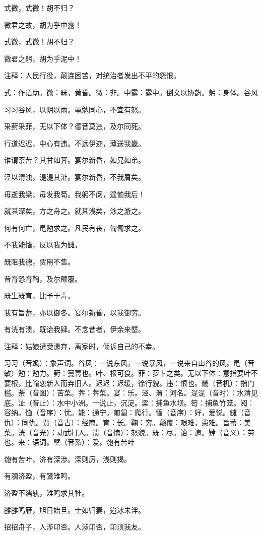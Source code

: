 \documentclass[12pt,UTF8]{ctexbook}
\begin{document}
式微，式微！胡不归？

微君之故，胡为乎中露！

式微，式微！胡不归？

微君之躬，胡为乎泥中！

注释：人民行役，颠连困苦，对统治者发出不平的怨恨。 

式：作语助。微：昧，黄昏。微：非。中露：露中。倒文以协韵。躬：身体。谷风

习习谷风，以阴以雨。黾勉同心，不宜有怒。

采葑采菲，无以下体？德音莫违，及尔同死。

行道迟迟，中心有违。不远伊迩，薄送我畿。

谁谓荼苦？其甘如荠。宴尔新昏，如兄如弟。

泾以渭浊，湜湜其沚。宴尔新昏，不我屑矣。

毋逝我梁，毋发我笱。我躬不阅，遑恤我后！

就其深矣，方之舟之。就其浅矣，泳之游之。

何有何亡，黾勉求之。凡民有丧，匍匐求之。

不我能慉，反以我为雠，

既阻我德，贾用不售。

昔育恐育鞫，及尔颠覆。

既生既育，比予于毒。

我有旨蓄，亦以御冬。宴尔新昏，以我御穷。

有洸有溃，既诒我肄。不念昔者，伊余来塈。

注释：姑娘遭受遗弃，离家时，倾诉自己的不幸。

习习（音飒）：象声词。谷风：一说东风，一说暴风，一说来自山谷的风。黾（音敏）勉：勉力。葑：蔓菁也。叶、根可食。菲：萝卜之类。无以下体：意指要叶不要根，比喻恋新人而弃旧人。迟迟：迟缓，徐行貌。违：恨也。畿（音机）：指门槛。荼（音图）：苦菜。荠：荠菜。宴：乐。泾、渭：河名。湜湜（音时）：水清见底。沚（音止）：水中小洲。一说止，沉淀。梁：捕鱼水坝。笱：捕鱼竹笼。阅：容纳。恤（音序）：忧。能：通宁。匍匐：爬行。慉（音序）：好，爱悦。雠（音仇）：同仇。贾（音古）：经商。育：长。鞠：穷。颠覆：艰难，患难。旨蓄：美菜。洸（音光）：动武打人。溃（音愧）：怒貌。既：尽。诒：遗。肄（音义）：劳也。来：语词。塈（音系）：爱。匏有苦叶

匏有苦叶，济有深涉。深则厉，浅则揭。

有瀰济盈，有鷕雉鸣。

济盈不濡轨，雉鸣求其牡。

雝雝鸣雁，旭日始旦。士如归妻，迨冰未泮。

招招舟子，人涉卬否。人涉卬否，卬须我友。
\end{document}
